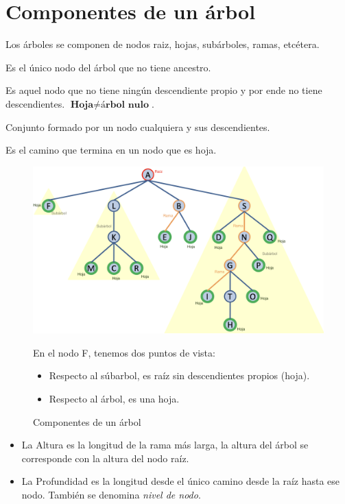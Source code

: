 \section{Componentes de un árbol}

Los árboles se componen de nodos raiz, hojas, subárboles, ramas, etcétera.

 Es el único nodo del árbol que no tiene ancestro.

 Es aquel nodo que no tiene ningún descendiente propio y por ende no tiene descendientes. \(\textbf{Hoja}\neq\textbf{árbol nulo}\).

 Conjunto formado por un nodo cualquiera y sus descendientes.

 Es el camino que termina en un nodo que es hoja.

\begin{figure}[h]
  \begin{center}
    \includegraphics[width=\textwidth]{assets/IntroArboles6.png}
  \end{center}
  \caption{Componentes de un árbol}
  En el nodo F, tenemos dos puntos de vista:
  \begin{itemize}
    \item Respecto al súbarbol, es raíz sin descendientes propios (hoja).
    \item Respecto al árbol, es una hoja.
  \end{itemize}
\end{figure}
\newpage
{}
\begin{itemize}
  \item La Altura es la longitud de la rama más larga, la altura del árbol se corresponde con la altura del nodo raíz.
  \item La Profundidad es la longitud desde el único camino desde la raíz hasta ese nodo. También se denomina \textit{nivel de nodo}.
\end{itemize}

